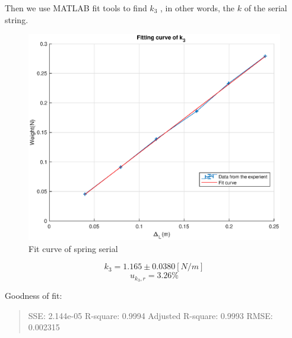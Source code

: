 Then we use MATLAB fit tools to find $k_3$ , in other words, the $k$ of the serial string.

\begin{figure}[H]
\centering
\includegraphics[width=15cm]{matlab/fitfig/k3}
\caption{Fit curve of spring serial}
\end{figure}

$$k_3 = 1.165 \pm 0.0380 [N/m] $$
$$ u_{k_3,r} = 3.26 \% $$

Goodness of fit:
\begin{quote}
\centering
	SSE: 2.144e-05
	R-square: 0.9994
	Adjusted R-square: 0.9993
	RMSE: 0.002315 
\end{quote}